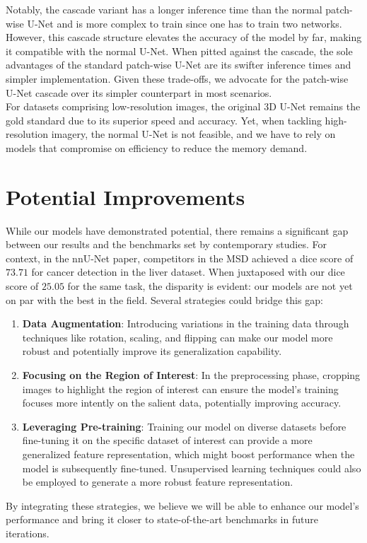 Notably, the cascade variant has a longer inference time than the normal patch-wise U-Net and is more complex to train since one has to train two networks. However, this cascade structure elevates the accuracy of the model by far, making it compatible with the normal U-Net.
When pitted against the cascade, the sole advantages of the standard patch-wise U-Net are its swifter inference times and simpler implementation. Given these trade-offs, we advocate for the patch-wise U-Net cascade over its simpler counterpart in most scenarios.\\[1ex]
For datasets comprising low-resolution images, the original $3$D U-Net remains the gold standard due to its superior speed and accuracy.
Yet, when tackling high-resolution imagery, the normal U-Net is not feasible, and we have to rely on models that compromise on efficiency to reduce the memory demand.

\section{Potential Improvements}
While our models have demonstrated potential, there remains a significant gap between our results and the benchmarks set by contemporary studies.
For context, in the nnU-Net paper, competitors in the MSD achieved a dice score of $73.71$ for cancer detection in the liver dataset\cite[9]{isensee_nnu-net_2018}.
When juxtaposed with our dice score of $25.05$ for the same task, the disparity is evident: our models are not yet on par with the best in the field.
Several strategies could bridge this gap:
\begin{enumerate}
	\item \textbf{Data Augmentation}: Introducing variations in the training data through techniques like rotation, scaling, and flipping can make our model more robust and potentially improve its generalization capability.
	\item \textbf{Focusing on the Region of Interest}: In the preprocessing phase, cropping images to highlight the region of interest can ensure the model's training focuses more intently on the salient data, potentially improving accuracy.
	\item \textbf{Leveraging Pre-training}: Training our model on diverse datasets before fine-tuning it on the specific dataset of interest can provide a more generalized feature representation,
	which might boost performance when the model is subsequently fine-tuned. Unsupervised learning techniques could also be employed to generate a more robust feature representation.
\end{enumerate}
By integrating these strategies, we believe we will be able to enhance our model's performance and bring it closer to state-of-the-art benchmarks in future iterations.

